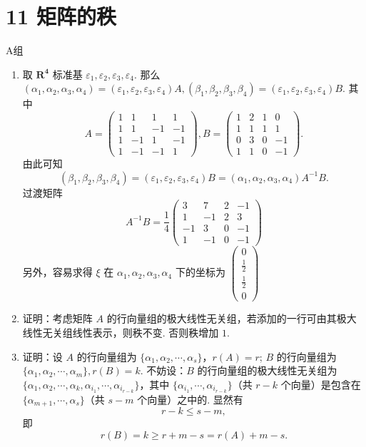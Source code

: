 \section*{11 矩阵的秩}

\vspace{2ex}

\centerline{\heiti A组}
\begin{enumerate}
    \item 取 $\mathbf{R^4}$ 标准基 $\varepsilon_1,\varepsilon_2,\varepsilon_3,\varepsilon_4$.
    那么 $(\alpha_1,\alpha_2,\alpha_3,\alpha_4)=(\varepsilon_1,\varepsilon_2,\varepsilon_3,\varepsilon_4)A,(\beta_1,\beta_2,\beta_3,\beta_4)=(\varepsilon_1,\varepsilon_2,\varepsilon_3,\varepsilon_4)B.$
    其中 \[A=\begin{pmatrix}1 & 1 & 1 & 1 \\ 1 & 1 & -1 & -1 \\ 1 & -1 & 1 & -1 \\ 1 & -1 & -1 & 1\end{pmatrix},B=\begin{pmatrix}1 & 2 & 1 & 0 \\ 1 & 1 & 1 & 1 \\ 0 & 3 & 0 & -1 \\ 1 & 1 & 0 & -1\end{pmatrix}.\] 
    由此可知 \[(\beta_1,\beta_2,\beta_3,\beta_4)=(\varepsilon_1,\varepsilon_2,\varepsilon_3,\varepsilon_4)B=(\alpha_1,\alpha_2,\alpha_3,\alpha_4)A^{-1}B.\]
    过渡矩阵 \[A^{-1}B=\dfrac{1}{4}\begin{pmatrix}3 & 7 & 2 & -1 \\ 1 & -1 & 2 & 3 \\ -1 & 3 & 0 & -1 \\ 1 & -1 & 0 & -1\end{pmatrix}\]
    另外，容易求得 $\xi$ 在 $\alpha_1,\alpha_2,\alpha_3,\alpha_4$ 下的坐标为 $\begin{pmatrix}0 \\ \frac{1}{2} \\ \frac{1}{2} \\ 0\end{pmatrix}$
    \item 证明：考虑矩阵 $A$ 的行向量组的极大线性无关组，若添加的一行可由其极大线性无关组线性表示，则秩不变. 否则秩增加 $1$. 
    \item 证明：设 $A$ 的行向量组为 $\{\alpha_1,\alpha_2,\cdots,\alpha_s\}$，$r(A)=r$; $B$ 的行向量组为 $\{\alpha_1,\alpha_2,\cdots,\alpha_m\},r(B)=k$.
    不妨设：$B$ 的行向量组的极大线性无关组为 $\{\alpha_1,\alpha_2,\cdots,\alpha_k,\alpha_{i_1},\cdots,\alpha_{i_{r-k}}\}$，其中 $\{\alpha_{i_1},\cdots,\alpha_{i_{r-k}}\}$（共 $r-k$ 个向量）是包含在 $\{\alpha_{m+1},\cdots,\alpha_s\}$（共 $s-m$ 个向量）之中的. 显然有
    \[r-k \leq s-m,\]
    即
    \[r(B)=k\ge r+m-s=r(A)+m-s.\]
\end{enumerate}

